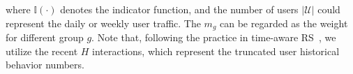 
where $\mathbb{I}(\cdot)$ denotes the indicator function, and the number of users $|\mathcal{U}|$ could represent the daily or weekly user traffic. The $m_g$ can be regarded as the weight for different group $g$. Note that, following the practice in time-aware RS~\citep{kang2018self, sun2019bert4rec}, we utilize the recent $H$ interactions,  which represent the truncated user historical behavior numbers.








